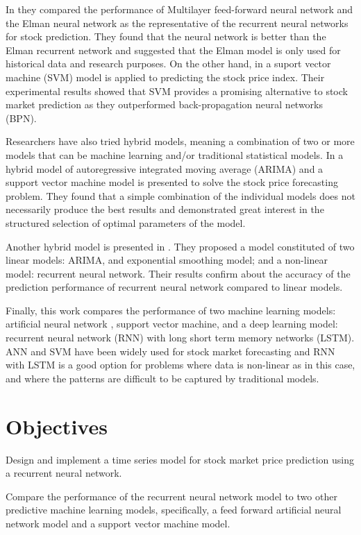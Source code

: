 In \cite{shah2014performance} they compared the performance of Multilayer feed-forward neural network and the Elman neural network as the representative of the recurrent neural networks for stock prediction. They found that the neural network is better than the Elman recurrent network and suggested that the Elman model is only used for historical data and research purposes. On the other hand, in \cite{kim2003financial} a suport vector machine (SVM) model is applied to predicting the stock price index. Their experimental results showed that SVM provides a promising alternative to stock market prediction as they outperformed back-propagation neural networks (BPN).

Researchers have also tried hybrid models, meaning a combination of two or more models that can be machine learning and/or traditional statistical models. In \cite{pai2005hybrid} a hybrid model of autoregressive integrated moving average (ARIMA) and a support vector machine model is presented to solve the stock price forecasting problem. They found that a simple combination of the individual models does not necessarily produce the best results and demonstrated great interest in the structured selection of optimal parameters of the model.

Another hybrid model is presented in \cite{rather2015recurrent}. They proposed a model constituted of two linear models: ARIMA, and exponential smoothing model; and a non-linear model: recurrent neural network. Their results confirm about the accuracy of the prediction performance of recurrent neural network compared to linear models.

Finally, this work compares the performance of two machine learning models: artificial neural network , support vector machine, and a deep learning model: recurrent neural network (RNN) with long short term memory networks (LSTM). ANN and SVM have been widely used for stock market forecasting and RNN with LSTM is a good option for problems where data is non-linear as in this case, and where the patterns are difficult to be captured by traditional models.

\section{Objectives}
Design and implement a time series model for stock market price prediction using a recurrent neural network.

Compare the performance of the recurrent neural network model to two other predictive machine learning models, specifically, a feed forward artificial neural network model and a support vector machine model.

